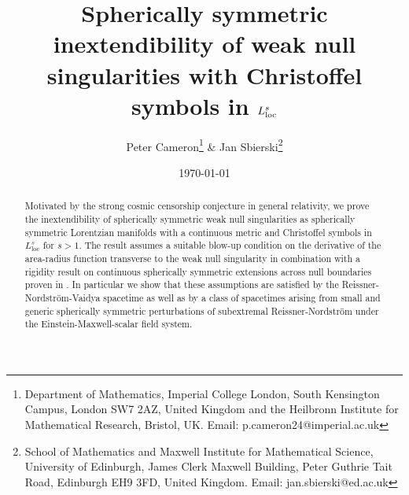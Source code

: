\documentclass{article}
\title{Spherically symmetric inextendibility of weak null singularities with Christoffel symbols in $L^s_{\loc}$}
\author{\bigskip Peter Cameron\footnote{Department of Mathematics, Imperial College London, South Kensington Campus, London SW7 2AZ, United Kingdom and the Heilbronn Institute for
Mathematical Research, Bristol, UK. Email: p.cameron24@imperial.ac.uk} \hspace{1pt} \& Jan Sbierski\footnote{School of Mathematics and Maxwell Institute for Mathematical Science, University of Edinburgh, James Clerk Maxwell Building, Peter Guthrie Tait Road, Edinburgh EH9 3FD, United Kingdom. Email: jan.sbierski@ed.ac.uk}
}
\date{\today}
\newcommand{\loc}{\mathrm{loc}}
\begin{document}
\maketitle
\begin{abstract}
Motivated by the strong cosmic censorship conjecture in general relativity, we prove the inextendibility of spherically symmetric weak null singularities as spherically symmetric Lorentzian manifolds with a continuous metric and Christoffel symbols in $L^{s}_{\loc}$ for $s >1$. The result assumes a suitable blow-up condition on the derivative of the area-radius function transverse to the weak null singularity in combination with a rigidity result on continuous spherically symmetric extensions across null boundaries proven in \cite{CameronSbierski}. In particular we show that these assumptions are satisfied by the Reissner-Nordstr\"{o}m-Vaidya spacetime as well as by a class of spacetimes arising from small and generic spherically symmetric perturbations of subextremal Reissner-Nordstr\"{o}m under the Einstein-Maxwell-scalar field system.


\end{abstract}

\begingroup
\setlength{\parskip}{0pt}
\tableofcontents
\endgroup
\end{document}
